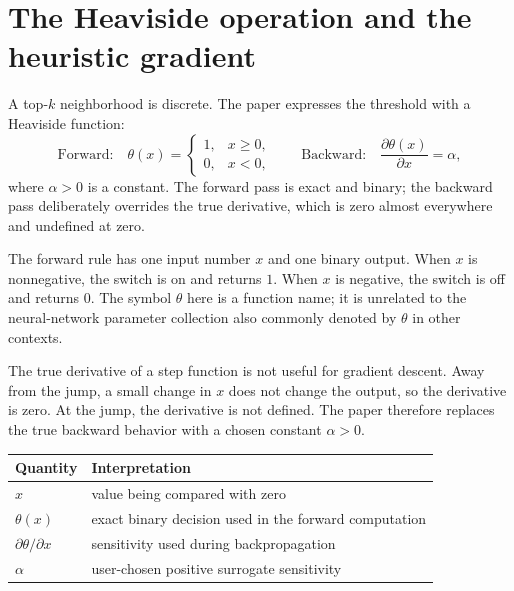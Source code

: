 \documentclass[11pt,oneside,openany]{book}
\theoremstyle{myplain}
\theoremstyle{definition}
\newcommand{\paperEq}[1]{\tag{P#1}}
\begin{document}
\section{The Heaviside operation and the heuristic gradient}

A top-$k$ neighborhood is discrete. The paper expresses the threshold with a Heaviside function:
\begin{equation*}
\text{Forward:}\quad
\theta(x)=\begin{cases}1,&x\ge 0,\\0,&x<0,\end{cases}
\qquad
\text{Backward:}\quad \frac{\partial\theta(x)}{\partial x}=\alpha,
\paperEq{1}
\label{eq:heaviside}
\end{equation*}
where $\alpha>0$ is a constant. The forward pass is exact and binary; the backward pass deliberately overrides the true derivative, which is zero almost everywhere and undefined at zero.

\begin{conceptbox}[title=Read the Heaviside rule as a switch]
The forward rule has one input number $x$ and one binary output. When $x$ is nonnegative, the switch is on and returns $1$. When $x$ is negative, the switch is off and returns $0$. The symbol $\theta$ here is a function name; it is unrelated to the neural-network parameter collection also commonly denoted by $\theta$ in other contexts.
\end{conceptbox}

The true derivative of a step function is not useful for gradient descent. Away from the jump, a small change in $x$ does not change the output, so the derivative is zero. At the jump, the derivative is not defined. The paper therefore replaces the true backward behavior with a chosen constant $\alpha>0$.

\begin{center}
\begin{tabularx}{\textwidth}{>{\bfseries}l X}
\toprule
Quantity & Interpretation \\
\midrule
$x$ & value being compared with zero \\
$\theta(x)$ & exact binary decision used in the forward computation \\
$\partial\theta/\partial x$ & sensitivity used during backpropagation \\
$\alpha$ & user-chosen positive surrogate sensitivity \\
\bottomrule
\end{tabularx}
\end{center}
\end{document}
